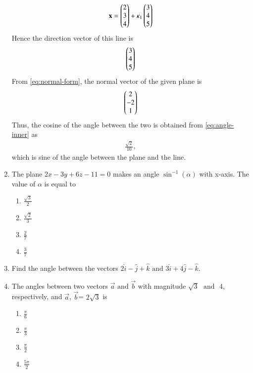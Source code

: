 \begin{enumerate}[label=\thesubsection.\arabic*,ref=\thesubsection.\theenumi]
\begin{align}
	\mathbf{x} = \begin{pmatrix}2 \\ 3 \\ 4\end{pmatrix} + \kappa_1 \begin{pmatrix}3 \\ 4 \\ 5\end{pmatrix}
\end{align}
Hence the direction vector of this line is 
\begin{align}
\begin{pmatrix}3 \\ 4 \\ 5\end{pmatrix}
\end{align}
	From \eqref{eq:normal-form}, the normal vector of the given plane is 
\begin{align}
\begin{pmatrix}2 \\ -2 \\ 1\end{pmatrix}
\end{align}
Thus, the cosine of the angle between the two is 
obtained from \eqref{eq:angle-inner} as
\begin{align}
	\frac{\sqrt{2}}{10},
\end{align}
which is sine of the angle between the plane and the line.
\item The plane $2x-3y+6z-11=0$ makes an angle $\sin^{-1}(\alpha)$ with x-axis. The value of $\alpha$ is equal to 
\begin{enumerate}
	\item  $\frac{\sqrt{3}}{2}$
	\item  $\frac{\sqrt{2}}{3}$
	\item  $\frac{2}{7}$
	\item  $\frac{3}{7}$
\end{enumerate}
\item Find the angle between the vectors $2\hat{i}-\hat{j}+\hat{k}$ $\text{and}$ $3\hat{i}+4\hat{j}-\hat{k}$.
\item The angles between two vectors $\vec{a}$ $\text{and}$ $\vec{b}$ with magnitude $\sqrt{3}$ $\text{ and }$ 4, respectively, and $\vec{a}$, $\vec{b}$= $2\sqrt{3}$ is
	\begin{enumerate}
\item $\frac{\pi}{6}$
\item $\frac{\pi}{3}$
\item $\frac{\pi}{2}$ 
\item $\frac{5\pi}{2}$
\end{enumerate}


\end{enumerate}
